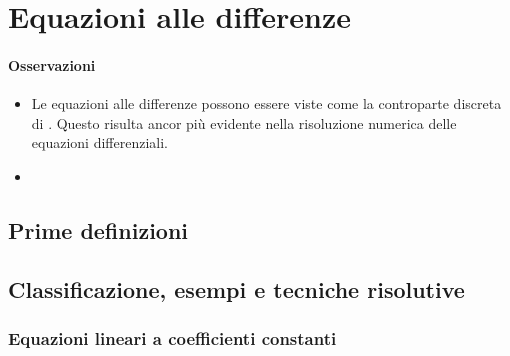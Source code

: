 \documentclass[letterpaper,10pt,italian]{jupyterBook}
\begin{document}
\sphinxstepscope


\chapter{Equazioni alle differenze}
\label{\detokenize{ch/difference-equations:equazioni-alle-differenze}}\label{\detokenize{ch/difference-equations:math-hs-difference-equations}}\label{\detokenize{ch/difference-equations::doc}}\subsubsection*{Osservazioni}
\begin{itemize}
\item {} 
\sphinxAtStartPar
Le equazioni alle differenze possono essere viste come la controparte discreta di {\hyperref[\detokenize{ch/ode:ode-hs}]{}}. Questo risulta ancor più evidente nella risoluzione numerica delle equazioni differenziali.

\item {} 
\sphinxAtStartPar
{}

\end{itemize}


\section{Prime definizioni}
\label{\detokenize{ch/difference-equations:prime-definizioni}}\label{\detokenize{ch/difference-equations:math-hs-difference-equations-def}}

\section{Classificazione, esempi e tecniche risolutive}
\label{\detokenize{ch/difference-equations:classificazione-esempi-e-tecniche-risolutive}}\label{\detokenize{ch/difference-equations:math-hs-difference-equations-types}}

\subsection{Equazioni lineari a coefficienti constanti}
\label{\detokenize{ch/difference-equations:equazioni-lineari-a-coefficienti-constanti}}\label{\detokenize{ch/difference-equations:ode-hs-types-linear-const}}
\end{document}
